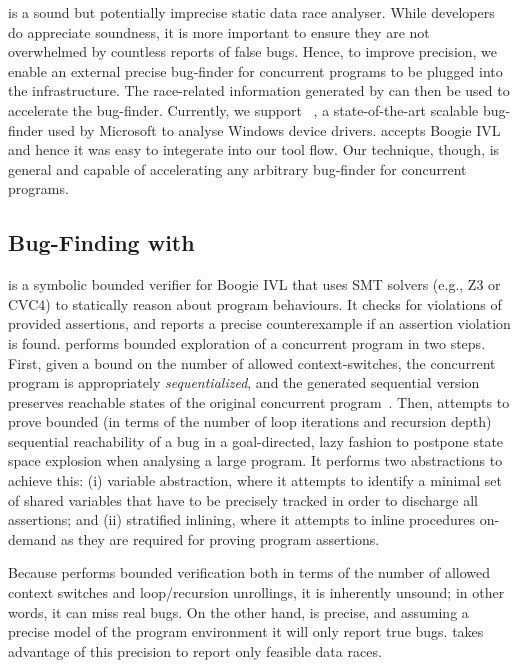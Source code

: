 \whoop is a sound but potentially imprecise static data race analyser.  While
developers do appreciate soundness, it is more important to ensure they are not
overwhelmed by countless reports of false bugs.  Hence, to improve precision, we
enable an external precise bug-finder for concurrent programs to be plugged into
the \whoop infrastructure. The race-related information generated by \whoop can
then be used to accelerate the bug-finder.  Currently, we support
\corral~\cite{lal2012corral}, a state-of-the-art scalable bug-finder used by
Microsoft to analyse Windows device drivers. \corral accepts Boogie IVL and
hence it was easy to integerate into our tool flow. Our technique, though, is
general and capable of accelerating any arbitrary bug-finder for concurrent
programs.

\subsection{Bug-Finding with \corral}
\label{bf:corral}

\corral is a symbolic bounded verifier for Boogie IVL that uses SMT solvers
(e.g., Z3 or CVC4) to statically reason about program behaviours. It checks for
violations of provided assertions, and reports a precise counterexample if an
assertion violation is found. \corral performs bounded exploration of a
concurrent program in two steps. First, given a bound on the number of allowed
context-switches, the concurrent program is appropriately \emph{sequentialized},
and the generated sequential version preserves reachable states of the original
concurrent program~\cite{popl2011-eqr,cav2009-lqr,cavLalR08}.  Then, \corral
attempts to prove bounded (in terms of the number of loop iterations and
recursion depth) sequential reachability of a bug in a goal-directed, lazy
fashion to postpone state space explosion when analysing a large program.  It
performs two abstractions to achieve this: (i) variable abstraction, where it
attempts to identify a minimal set of shared variables that have to be precisely
tracked in order to discharge all assertions; and (ii) stratified inlining,
where it attempts to inline procedures on-demand as they are required for
proving program assertions.


Because \corral performs bounded verification both in terms of the number of
allowed context switches and loop/recursion unrollings, it is inherently
unsound; in other words, it can miss real bugs. On the other hand, \corral is
precise, and assuming a precise model of the program environment it will only
report true bugs. \whoop takes advantage of this precision to report only
feasible data races.

